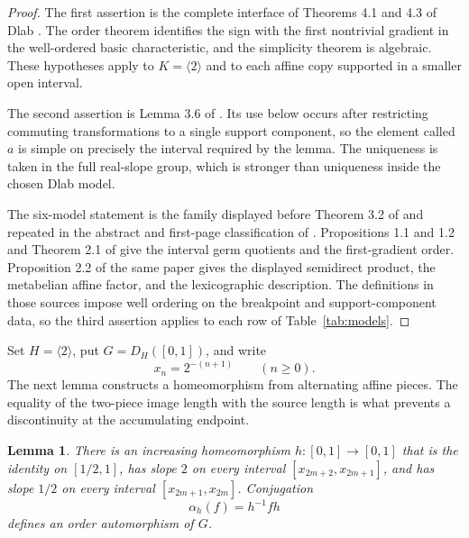 \documentclass[11pt]{amsart}
\newtheorem{lemma}[theorem]{Lemma}
\theoremstyle{definition}
\theoremstyle{remark}
\numberwithin{equation}{section}
\begin{document}
\begin{proof}
The first assertion is the complete interface of Theorems 4.1 and 4.3 of Dlab \cite{Dlab1968}. The order theorem identifies the sign with the first nontrivial gradient in the well-ordered basic characteristic, and the simplicity theorem is algebraic. These hypotheses apply to \(K=\langle2\rangle\) and to each affine copy supported in a smaller open interval.

The second assertion is Lemma 3.6 of \cite{Dlab1968}. Its use below occurs after restricting commuting transformations to a single support component, so the element called \(a\) is simple on precisely the interval required by the lemma. The uniqueness is taken in the full real-slope group, which is stronger than uniqueness inside the chosen Dlab model.

The six-model statement is the family displayed before Theorem 3.2 of \cite{ZenkovMedvedev} and repeated in the abstract and first-page classification of \cite{Medvedev2001}. Propositions 1.1 and 1.2 and Theorem 2.1 of \cite{ZenkovMedvedev} give the interval germ quotients and the first-gradient order. Proposition 2.2 of the same paper gives the displayed semidirect product, the metabelian affine factor, and the lexicographic description. The definitions in those sources impose well ordering on the breakpoint and support-component data, so the third assertion applies to each row of Table~\ref{tab:models}.
\end{proof}

Set \(H=\langle2\rangle\), put \(G=D_H([0,1])\), and write
\[
x_n=2^{-(n+1)}
\qquad(n\geq0).
\]
The next lemma constructs a homeomorphism from alternating affine pieces. The equality of the two-piece image length with the source length is what prevents a discontinuity at the accumulating endpoint.

\begin{lemma}
\label{lem:normalizer}
There is an increasing homeomorphism \(h:[0,1]\to[0,1]\) that is the identity on \([1/2,1]\), has slope \(2\) on every interval \([x_{2m+2},x_{2m+1}]\), and has slope \(1/2\) on every interval \([x_{2m+1},x_{2m}]\). Conjugation
\[
\alpha_h(f)=h^{-1}fh
\]
defines an order automorphism of \(G\).
\end{lemma}
\end{document}
